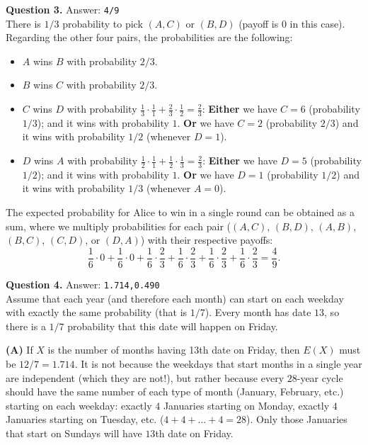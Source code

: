 \documentclass[jou]{apa6}
\begin{document}
\vspace{10pt}
{\bf Question 3.} Answer: {\tt 4/9}\\
There is $1/3$ probability to pick $(A,C)$ or $(B,D)$ (payoff is $0$ in this case).\\
Regarding the other four pairs, the probabilities are the following:
\begin{itemize}
\item $A$ wins $B$ with probability $2/3$.
\item $B$ wins $C$ with probability $2/3$.
\item $C$ wins $D$ with probability $\frac{1}{3} \cdot \frac{1}{1} + \frac{2}{3} \cdot \frac{1}{2}=\frac{2}{3}$:
{\bf Either} we have $C=6$ (probability $1/3$); and it wins with probability $1$. {\bf Or} we have $C=2$ (probability $2/3$) 
and it wins with probability $1/2$ (whenever $D=1$).
\item $D$ wins $A$ with probability $\frac{1}{2} \cdot \frac{1}{1} + \frac{1}{2} \cdot \frac{1}{3}=\frac{2}{3}$:
{\bf Either} we have $D=5$ (probability $1/2$); and it wins with probability $1$. {\bf Or} we have $D=1$ (probability $1/2$) 
and it wins with probability $1/3$ (whenever $A=0$).
\end{itemize}

The expected probability for Alice to win in a single round can be obtained 
as a sum, where we multiply probabilities for each pair 
($(A,C)$, $(B,D)$, $(A,B)$, $(B,C)$, $(C,D)$, or $(D,A)$) with their respective payoffs:
$$\frac{1}{6} \cdot 0 + \frac{1}{6} \cdot 0 + \frac{1}{6} \cdot \frac{2}{3}
+ \frac{1}{6} \cdot \frac{2}{3} + \frac{1}{6} \cdot \frac{2}{3} + \frac{1}{6} \cdot \frac{2}{3} = \frac{4}{9}.$$



\vspace{10pt}
{\bf Question 4.} Answer: {\tt 1.714,0.490}\\
Assume that each year (and therefore each month) can start on 
each weekday with exactly the same probability (that is $1/7$). 
Every month has date $13$, so there is a $1/7$ probability that 
this date will happen on Friday. 

{\bf (A)} If $X$ is the number of months having 13th date on Friday, 
then $E(X)$ must be $12/7 = 1.714$. It is not because the
weekdays that start months in a single year are independent (which they are not!), 
but rather because every $28$-year cycle 
should have the same number of each type of month (January, February, etc.) 
starting on each weekday: exactly $4$ Januaries starting on Monday, 
exactly $4$ Januaries starting on Tuesday, etc. ($4+4+\ldots+4 = 28$).
Only those Januaries that start on Sundays will have $13$th date on Friday. 
\end{document}
